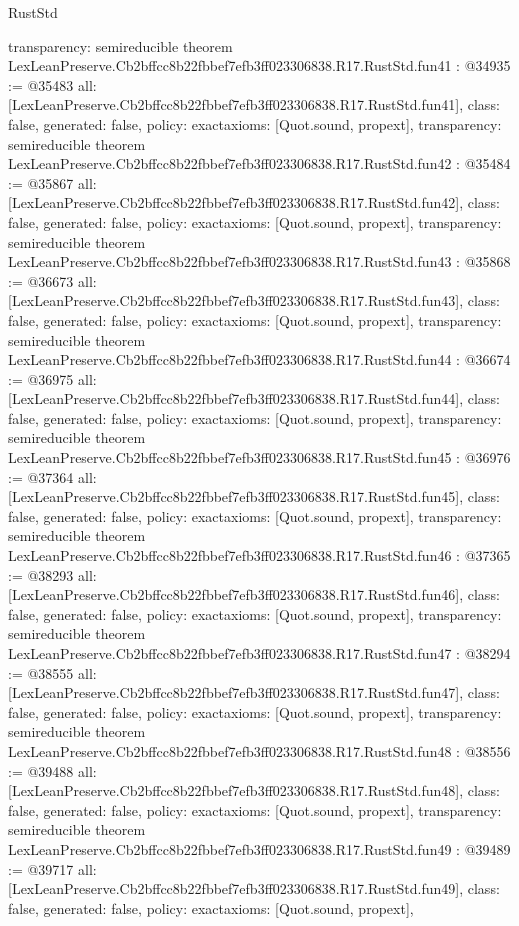 \begin{lexlean}{RustStd}
\begin{coremodule}
{  transparency: semireducible
}
theorem LexLeanPreserve.Cb2bffcc8b22fbbef7efb3ff023306838.R17.RustStd.fun41 : @34935 := @35483 {
  all: [LexLeanPreserve.Cb2bffcc8b22fbbef7efb3ff023306838.R17.RustStd.fun41],
  class: false,
  generated: false,
  policy: exact{axioms: [Quot.sound, propext]},
  transparency: semireducible
}
theorem LexLeanPreserve.Cb2bffcc8b22fbbef7efb3ff023306838.R17.RustStd.fun42 : @35484 := @35867 {
  all: [LexLeanPreserve.Cb2bffcc8b22fbbef7efb3ff023306838.R17.RustStd.fun42],
  class: false,
  generated: false,
  policy: exact{axioms: [Quot.sound, propext]},
  transparency: semireducible
}
theorem LexLeanPreserve.Cb2bffcc8b22fbbef7efb3ff023306838.R17.RustStd.fun43 : @35868 := @36673 {
  all: [LexLeanPreserve.Cb2bffcc8b22fbbef7efb3ff023306838.R17.RustStd.fun43],
  class: false,
  generated: false,
  policy: exact{axioms: [Quot.sound, propext]},
  transparency: semireducible
}
theorem LexLeanPreserve.Cb2bffcc8b22fbbef7efb3ff023306838.R17.RustStd.fun44 : @36674 := @36975 {
  all: [LexLeanPreserve.Cb2bffcc8b22fbbef7efb3ff023306838.R17.RustStd.fun44],
  class: false,
  generated: false,
  policy: exact{axioms: [Quot.sound, propext]},
  transparency: semireducible
}
theorem LexLeanPreserve.Cb2bffcc8b22fbbef7efb3ff023306838.R17.RustStd.fun45 : @36976 := @37364 {
  all: [LexLeanPreserve.Cb2bffcc8b22fbbef7efb3ff023306838.R17.RustStd.fun45],
  class: false,
  generated: false,
  policy: exact{axioms: [Quot.sound, propext]},
  transparency: semireducible
}
theorem LexLeanPreserve.Cb2bffcc8b22fbbef7efb3ff023306838.R17.RustStd.fun46 : @37365 := @38293 {
  all: [LexLeanPreserve.Cb2bffcc8b22fbbef7efb3ff023306838.R17.RustStd.fun46],
  class: false,
  generated: false,
  policy: exact{axioms: [Quot.sound, propext]},
  transparency: semireducible
}
theorem LexLeanPreserve.Cb2bffcc8b22fbbef7efb3ff023306838.R17.RustStd.fun47 : @38294 := @38555 {
  all: [LexLeanPreserve.Cb2bffcc8b22fbbef7efb3ff023306838.R17.RustStd.fun47],
  class: false,
  generated: false,
  policy: exact{axioms: [Quot.sound, propext]},
  transparency: semireducible
}
theorem LexLeanPreserve.Cb2bffcc8b22fbbef7efb3ff023306838.R17.RustStd.fun48 : @38556 := @39488 {
  all: [LexLeanPreserve.Cb2bffcc8b22fbbef7efb3ff023306838.R17.RustStd.fun48],
  class: false,
  generated: false,
  policy: exact{axioms: [Quot.sound, propext]},
  transparency: semireducible
}
theorem LexLeanPreserve.Cb2bffcc8b22fbbef7efb3ff023306838.R17.RustStd.fun49 : @39489 := @39717 {
  all: [LexLeanPreserve.Cb2bffcc8b22fbbef7efb3ff023306838.R17.RustStd.fun49],
  class: false,
  generated: false,
  policy: exact{axioms: [Quot.sound, propext]},
}
\end{coremodule}
\end{lexlean}
